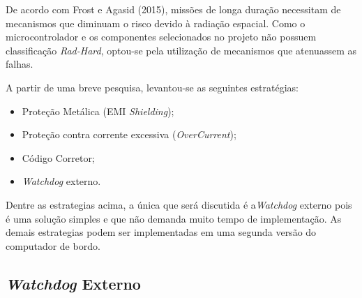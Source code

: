 De acordo com  Frost e Agasid (2015), missões de longa duração necessitam de mecanismos que diminuam o risco devido à radiação espacial. Como o microcontrolador e os componentes selecionados no projeto não possuem classificação \textit{Rad-Hard}, optou-se pela utilização de mecanismos que atenuassem as falhas. 

A partir de uma breve pesquisa, levantou-se as seguintes estratégias:
\begin{itemize}
	\item Proteção Metálica (EMI \textit{Shielding});
	\item Proteção contra corrente excessiva (\textit{OverCurrent});
	\item Código Corretor;
	\item \textit{Watchdog} externo.
\end{itemize}

Dentre as estrategias acima, a única que será discutida é a\textit{Watchdog} externo pois é uma solução simples e que não demanda muito tempo de implementação. As demais estrategias podem ser implementadas em uma segunda versão do computador de bordo.

\subsection{\textit{Watchdog} Externo}


